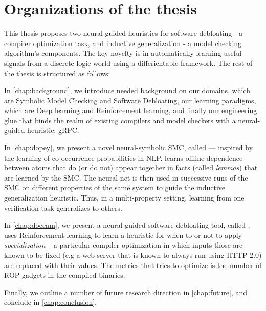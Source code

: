 \section{Organizations of the thesis}
This thesis proposes two neural-guided heuristics for  software debloating - a compiler optimization task, and inductive generalization - a model checking algorithm's components. The key novelty is in automatically learning useful signals from a discrete logic world using a differientable framework. The rest of the thesis is structured as follows:

In \cref{chap:background}, we introduce needed background on our domains, which are Symbolic Model Checking and Software Debloating, our learning paradigms, which are Deep learning and Reinforcement learning, and finally our engineering glue that binds the realm of existing compilers and model checkers with a neural-guided heuristic: gRPC.

In \cref{chap:dopey}, we present a novel neural-symbolic SMC, called \dpy --- inspired by the
learning of co-occurrence probabilities in NLP. \dpy
learns offline dependence between atoms that do (or do not) appear together in
facts (called \emph{lemmas}) that are learned by the SMC. The neural net
is then used in successive runs of the SMC on different properties of the same system to guide 
the inductive generalization heuristic. Thus, in a
multi-property setting, learning from one verification task generalizes to
others.

In \cref{chap:doccam}, we present a neural-guided software debloating tool, called \doccam. \doccam uses Reinforcement learning to learn a heuristic for when to or not to apply \emph{specialization} -- a particular compiler optimization in which inputs those are known to be fixed (e.g a web server that is known to always run using HTTP 2.0) are replaced with their values. The metrics that \doccam tries to optimize is the number of ROP gadgets in the compiled binaries.

Finally, we outline a number of future research direction in \cref{chap:future}, and conclude in \cref{chap:conclusion}.